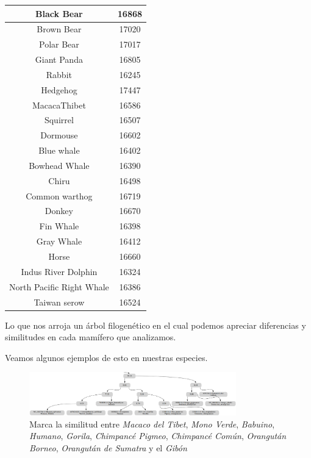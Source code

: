 \documentclass[12pt]{article}
\begin{document}
\begin{center}
  \vspace{3mm}
  \begin{tabular}{| c | c |}
    \hline
    \cellcolor{lightgray}Black Bear & \cellcolor{lightgray}16868 \\\hline
    Brown Bear & 17020 \\\hline
    \cellcolor{lightgray}Polar Bear & \cellcolor{lightgray}17017 \\\hline
    Giant Panda & 16805 \\\hline
    \cellcolor{lightgray}Rabbit & \cellcolor{lightgray}16245 \\\hline
    Hedgehog & 17447 \\\hline
    \cellcolor{lightgray}MacacaThibet & \cellcolor{lightgray}16586 \\\hline
    Squirrel & 16507 \\\hline
    \cellcolor{lightgray}Dormouse & \cellcolor{lightgray}16602 \\\hline
    Blue whale & 16402 \\\hline
    \cellcolor{lightgray}Bowhead Whale & \cellcolor{lightgray}16390 \\\hline
    Chiru & 16498 \\\hline
    \cellcolor{lightgray}Common warthog & \cellcolor{lightgray}16719 \\\hline
    Donkey & 16670 \\\hline
    \cellcolor{lightgray}Fin Whale & \cellcolor{lightgray}16398 \\\hline
    Gray Whale & 16412 \\\hline
    \cellcolor{lightgray}Horse & \cellcolor{lightgray}16660 \\\hline
    Indus River Dolphin & 16324 \\\hline
    \cellcolor{lightgray}North Pacific Right  Whale & \cellcolor{lightgray}16386 \\\hline
    Taiwan serow & 16524 \\\hline
  \end{tabular}
\end{center}

Lo que nos arroja un árbol filogenético en el cual podemos apreciar diferencias y similitudes en cada mamífero que analizamos. 

Veamos algunos ejemplos de esto en nuestras especies.

\begin{figure}[h!]
  \centering
  \includegraphics[width=0.8\textwidth]{images/Diferencia1.png}
  \caption{Marca la similitud entre \textit{Macaco del Tibet}, \textit{Mono Verde}, \textit{Babuino}, \textit{Humano}, \textit{Gorila}, \textit{Chimpancé Pigmeo}, \textit{Chimpancé Común}, \textit{Orangután Borneo}, \textit{Orangután de Sumatra} y el \textit{Gibón}}
\end{figure}
\end{document}
